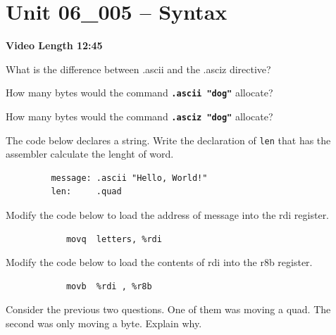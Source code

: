 \documentclass[letterpaper,12pt]{exam}
\newcommand{\unit}{Unit 06}
\begin{document}

\section*{\unit\_005 -- Syntax}
\par{\selectfont\textbf{Video Length 12:45}}
\begin{questions}

\begin{samepage}
    \question What is the difference between .ascii and the .asciz directive?
    \vspace{5mm}
\end{samepage}
\begin{samepage}
    \question How many bytes would the command \textbf{\texttt{.ascii "dog"}} allocate?
    \vspace{5mm}
\end{samepage}
\begin{samepage}
    \question How many bytes would the command \textbf{\texttt{.asciz "dog"}} allocate?
    \vspace{5mm}
\end{samepage}
\par
\begin{samepage}
    \question The code below declares a string.  Write the declaration of \texttt{len} that has the assembler calculate the lenght of word.
    \begin{verbatim}
         message: .ascii "Hello, World!"
         len:     .quad   
    \end{verbatim}        
    \vspace{5mm}
\end{samepage}
\par
 \begin{samepage}
     \question Modify the code below to load the address of message into the rdi register.
        \begin{verbatim}
            movq  letters, %rdi
        \end{verbatim}
     \vspace{5mm}
 \end{samepage}
 \par
 \begin{samepage}
     \question Modify the code below to load the contents of rdi into the r8b register.
        \begin{verbatim}
            movb  %rdi , %r8b
        \end{verbatim}
     \vspace{5mm}
 \end{samepage}
 \par 
 \question Consider the previous two questions.  One of them was moving a quad.  The second was only moving a byte.  Explain why.
\vspace{5mm}


\end{questions}
\end{document}
